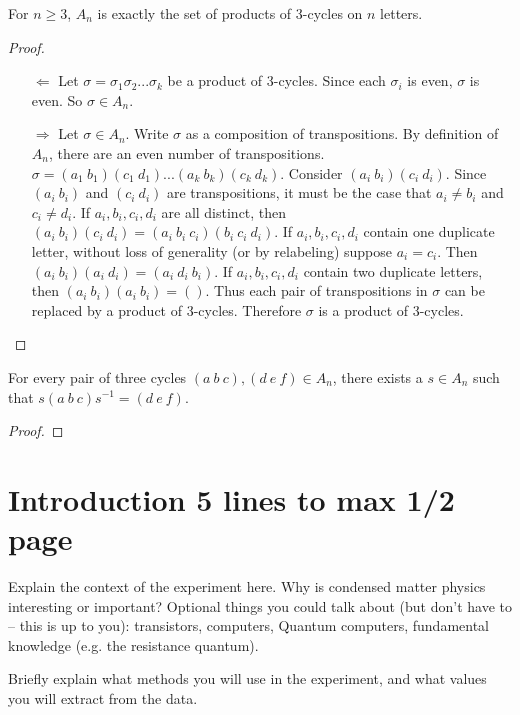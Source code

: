 \documentclass[a4paper]{article}
\begin{document}
\begin{theorem}For $n \ge 3$, $A_n$ is exactly the set of products of 3-cycles on $n$ letters.
\end{theorem}
\begin{proof}~
\begin{enumerate}
\item[$\Leftarrow$] Let $\sigma = \sigma_1 \sigma_2 ... \sigma_k$ be a product of 3-cycles. Since each $\sigma_i$ is even, $\sigma$ is even. So $\sigma \in A_n$.
\item[$\Rightarrow$] Let $\sigma \in A_n$. Write $\sigma$ as a composition of transpositions. By definition of $A_n$, there are an even number of transpositions. $\sigma = (a_1\ b_1)(c_1\ d_1)...(a_k\ b_k)(c_k\ d_k)$. Consider $(a_i\ b_i)(c_i\ d_i)$. Since $(a_i\ b_i)$ and $(c_i\ d_i)$ are transpositions, it must be the case that $a_i \ne b_i$ and $c_i \ne d_i$. If $a_i, b_i, c_i, d_i$ are all distinct, then $(a_i\ b_i)(c_i\ d_i) = (a_i\ b_i\ c_i)(b_i\ c_i\ d_i)$. If $a_i, b_i, c_i, d_i$ contain one duplicate letter, without loss of generality (or by relabeling) suppose $a_i = c_i$. Then $(a_i\ b_i)(a_i\ d_i) = (a_i\ d_i\ b_i)$. If $a_i, b_i, c_i, d_i$ contain two duplicate letters, then $(a_i\ b_i)(a_i\ b_i) = ()$. Thus each pair of transpositions in $\sigma$ can be replaced by a product of 3-cycles. Therefore $\sigma$ is a product of 3-cycles.
\end{enumerate}
\end{proof}

\begin{theorem} For every pair of three cycles $(a\ b\ c), (d\ e\ f) \in A_n$, there exists a $s \in A_n$ such that $s (a\ b\ c) s^{-1} = (d\ e\ f)$.
\end{theorem}
\begin{proof}
\end{proof}

\section{Introduction 5 lines to max 1/2 page}
\label{sec:introduction}

Explain the context of the experiment here. Why is condensed matter physics interesting or important?
Optional things you could talk about (but don't have to -- this is up to you): transistors, computers, Quantum computers, fundamental knowledge (e.g. the resistance quantum).

Briefly explain what methods you will use in the experiment, and what values you will extract from the data.
\end{document}
